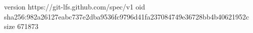 version https://git-lfs.github.com/spec/v1
oid sha256:982a26127eabc737e2dba9536fc9796d41fa237084749e36728bb4b40621952c
size 671873
